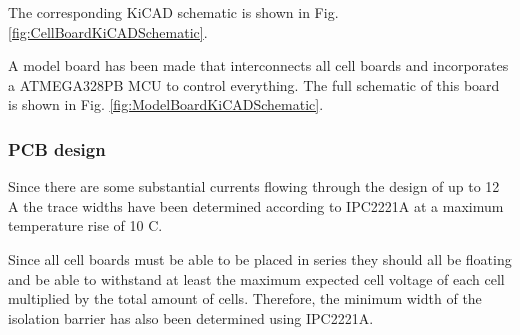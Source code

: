 The corresponding KiCAD schematic is shown in Fig. \ref{fig:CellBoardKiCADSchematic}.

A model board has been made that interconnects all cell boards and incorporates a ATMEGA328PB MCU to control everything. The full schematic of this board is shown in Fig. \ref{fig:ModelBoardKiCADSchematic}.

\subsubsection{PCB design}
Since there are some substantial currents flowing through the design of up to 12 A the trace widths have been determined according to IPC2221A at a maximum temperature rise of 10 \textdegree C.

Since all cell boards must be able to be placed in series they should all be floating and be able to withstand at least the maximum expected cell voltage of each cell multiplied by the total amount of cells. Therefore, the minimum width of the isolation barrier has also been determined using IPC2221A.


